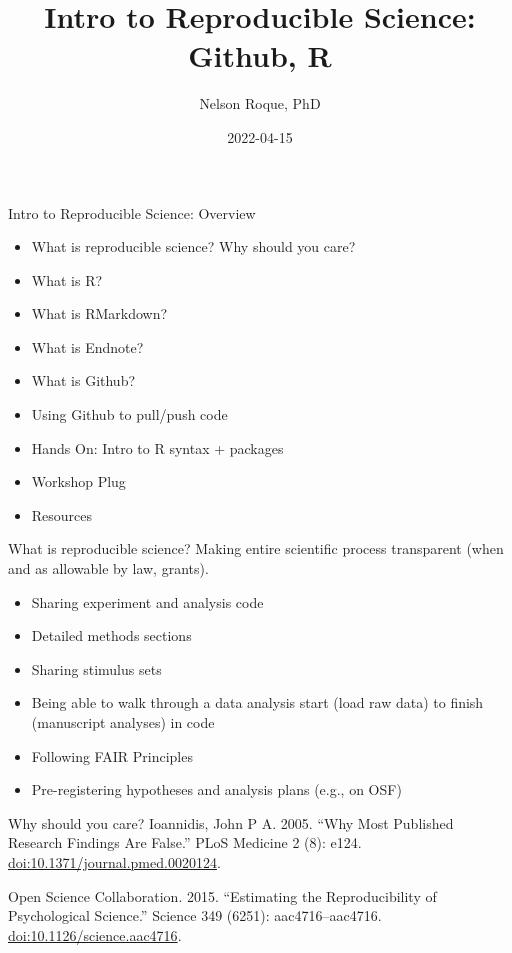 \documentclass[
  ignorenonframetext,
]{beamer}
\title{Intro to Reproducible Science: Github, R}
\author{Nelson Roque, PhD}
\date{2022-04-15}
\providecommand{\tightlist}{%
  \setlength{\itemsep}{0pt}\setlength{\parskip}{0pt}}
\begin{document}
\frame{\titlepage}

\begin{frame}{Intro to Reproducible Science: Overview}
\protect\hypertarget{intro-to-reproducible-science-overview}{}
\begin{itemize}
\tightlist
\item
  What is reproducible science? Why should you care?
\item
  What is R?
\item
  What is RMarkdown?
\item
  What is Endnote?
\item
  What is Github?
\item
  Using Github to pull/push code
\item
  Hands On: Intro to R syntax + packages
\item
  Workshop Plug
\item
  Resources
\end{itemize}
\end{frame}

\begin{frame}{What is reproducible science?}
\protect\hypertarget{what-is-reproducible-science}{}
Making entire scientific process transparent (when and as allowable by
law, grants).

\begin{itemize}
\tightlist
\item
  Sharing experiment and analysis code
\item
  Detailed methods sections
\item
  Sharing stimulus sets
\item
  Being able to walk through a data analysis start (load raw data) to
  finish (manuscript analyses) in code
\item
  Following FAIR Principles
\item
  Pre-registering hypotheses and analysis plans (e.g., on OSF)
\end{itemize}

\begin{block}{Why should you care?}
\protect\hypertarget{why-should-you-care}{}
Ioannidis, John P A. 2005. ``Why Most Published Research Findings Are
False.'' PLoS Medicine 2 (8): e124.
\url{doi:10.1371/journal.pmed.0020124}.

Open Science Collaboration. 2015. ``Estimating the Reproducibility of
Psychological Science.'' Science 349 (6251): aac4716--aac4716.
\url{doi:10.1126/science.aac4716}.
\end{block}
\end{frame}
\end{document}
